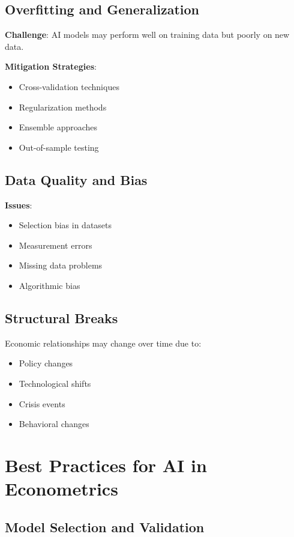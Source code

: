 \documentclass[12pt,a4paper]{article}
\begin{document}
\subsection{Overfitting and Generalization}

\textbf{Challenge}: AI models may perform well on training data but poorly on new data.

\textbf{Mitigation Strategies}:
\begin{itemize}
    \item Cross-validation techniques
    \item Regularization methods
    \item Ensemble approaches
    \item Out-of-sample testing
\end{itemize}

\subsection{Data Quality and Bias}

\textbf{Issues}:
\begin{itemize}
    \item Selection bias in datasets
    \item Measurement errors
    \item Missing data problems
    \item Algorithmic bias
\end{itemize}

\subsection{Structural Breaks}

Economic relationships may change over time due to:
\begin{itemize}
    \item Policy changes
    \item Technological shifts
    \item Crisis events
    \item Behavioral changes
\end{itemize}

\section{Best Practices for AI in Econometrics}

\subsection{Model Selection and Validation}
\end{document}
